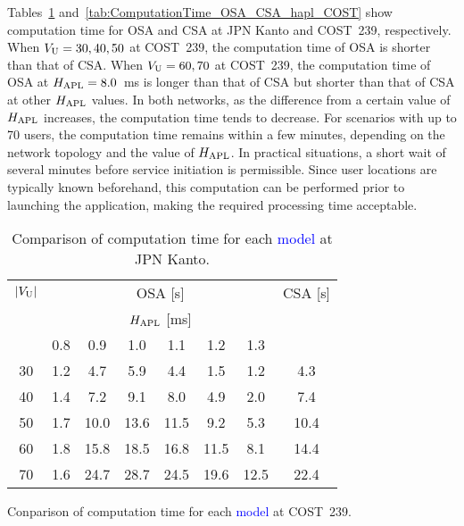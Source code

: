 \documentclass[10pt, letterpaper]{IEEEtran}
\newcommand\blue[1]{\textcolor{blue}{#1}}
\begin{document}
\begin{CJK}{UTF8}{ipxm}
Tables~\ref{tab:ComputationTime_OSA_CSA_hapl_JPN} and~\ref{tab:ComputationTime_OSA_CSA_hapl_COST} show computation time for OSA and CSA at JPN Kanto and COST~239, respectively.
When $V_{\rm U} = 30, 40, 50$ at COST~239, the computation time of OSA is shorter than that of CSA.
When $V_{\rm U} = 60, 70$ at COST~239, the computation time of OSA at $H_{\rm APL} = 8.0$~ms is longer than that of CSA but shorter than that of CSA at other $H_{\rm APL}$ values.
In both networks, as the difference from a certain value of $H_{\rm APL}$ increases, the computation time tends to decrease.
For scenarios with up to 70 users, the computation time remains within a few minutes, depending on the network topology and the value of $H_{\rm APL}$. 
In practical situations, a short wait of several minutes before service initiation is permissible.
Since user locations are typically known beforehand, this computation can be performed prior to launching the application, making the required processing time acceptable.
\begin{table}[t]
  \caption{Comparison of computation time for each \blue{model} at JPN Kanto.}
  \label{tab:ComputationTime_OSA_CSA_hapl_JPN}
  \begin{center}
    \begin{tabular}{c|cccccc|c}
      \hline
      $|V_{\rm{U}}|$ & \multicolumn{6}{c|}{OSA [s]} & CSA [s] \\ \cline{2-7}
       & \multicolumn{6}{c|}{$H_{\rm{APL}}$ [ms]} & \\
       & 0.8 & 0.9 & 1.0 & 1.1 & 1.2 & 1.3 &  \\
      \hline
      30 & 1.2 &  4.7 &  5.9 &  4.4 &  1.5 &  1.2 &  4.3 \\
      40 & 1.4 &  7.2 &  9.1 &  8.0 &  4.9 &  2.0 &  7.4 \\
      50 & 1.7 & 10.0 & 13.6 & 11.5 &  9.2 &  5.3 & 10.4 \\
      60 & 1.8 & 15.8 & 18.5 & 16.8 & 11.5 &  8.1 & 14.4 \\
      70 & 1.6 & 24.7 & 28.7 & 24.5 & 19.6 & 12.5 & 22.4 \\
      \hline
    \end{tabular}
  \end{center}
\end{table}
\begin{table}[t]
  \caption{Conparison of computation time for each \blue{model} at COST~239.}
  \label{tab:ComputationTime_OSA_CSA_hapl_COST}

\end{table}
\end{CJK}
\end{document}
